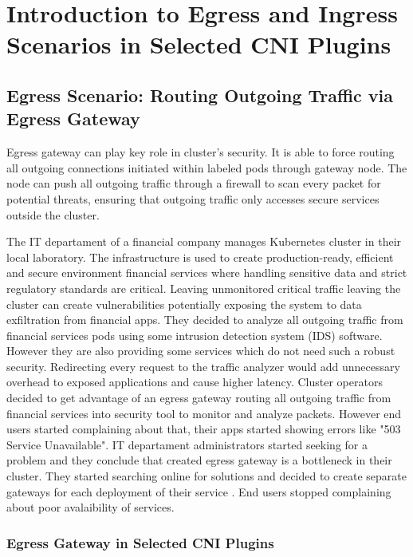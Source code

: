 \chapter{Introduction to Egress and Ingress Scenarios in Selected CNI Plugins}
\label{cha:introScenarios}

\section{Egress Scenario: Routing Outgoing Traffic via Egress Gateway}
\label{sec:egress}

Egress gateway can play key role in cluster's security. It is able to force routing all outgoing connections initiated within labeled pods through gateway node. The node can push all outgoing traffic through a firewall to scan every packet for potential threats, ensuring that outgoing traffic only accesses secure services outside the cluster.

The IT departament of a financial company manages Kubernetes cluster in their local laboratory. The infrastructure is used to create production-ready, efficient and secure environment financial services where handling sensitive data and strict regulatory standards are critical. Leaving unmonitored critical traffic leaving the cluster can create vulnerabilities potentially exposing the system to data exfiltration from financial apps. They decided to analyze all outgoing traffic from financial services pods using some intrusion detection system (IDS) software. However they are also providing some services which do not need such a robust security. Redirecting every request to the traffic analyzer would add unnecessary overhead to exposed applications and cause higher latency. Cluster operators decided to get advantage of an egress gateway routing all outgoing traffic from financial services into security tool to monitor and analyze packets. However end users started complaining about that, their apps started showing errors like "503 Service Unavailable". IT departament administrators started seeking for a problem and they conclude that created egress gateway is a bottleneck in their cluster. They started searching online for solutions and decided to create separate gateways for each deployment of their service \cite{CalicoEgressDeploy}. End users stopped complaining about poor avalaibility of services.

\subsection{Egress Gateway in Selected CNI Plugins}
\label{subsection:egressGateway}


